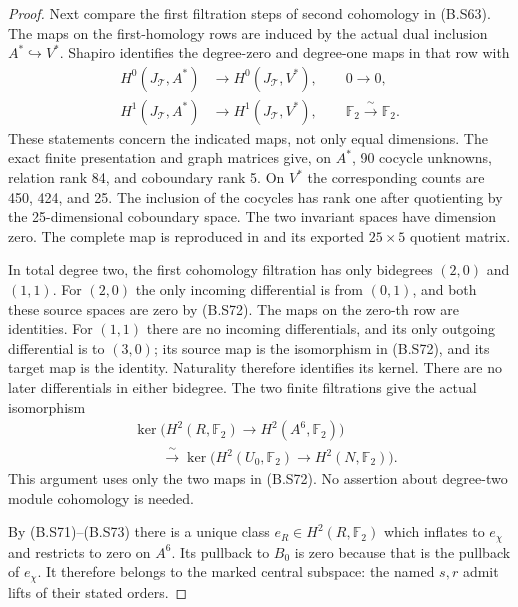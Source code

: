 \begin{proof}
Next compare the first filtration steps of second
cohomology in (B.S63).  The maps on the first-homology
rows are induced by the actual dual inclusion
$A^*\hookrightarrow V^*$.  Shapiro identifies the
degree-zero and degree-one maps in that row with
\[
\begin{aligned}
 H^0(J_{\mathcal T},A^*)&\longrightarrow
                         H^0(J_{\mathcal T},V^*),\qquad 0\longrightarrow0,\\
 H^1(J_{\mathcal T},A^*)&\longrightarrow
                         H^1(J_{\mathcal T},V^*),\qquad
                         \mathbb F_2\xrightarrow{\ \sim\ }\mathbb F_2.
\end{aligned}                                                   \tag{B.S72}
\]
These statements concern the indicated maps, not only
equal dimensions.  The exact finite presentation and
graph matrices give, on $A^*$, 90 cocycle unknowns,
relation rank 84, and coboundary rank 5.  On $V^*$ the
corresponding counts are 450, 424, and 25.  The
inclusion of the cocycles has rank one after quotienting
by the 25-dimensional coboundary space.  The two
invariant spaces have dimension zero.  The complete
map is reproduced in
and its exported $25\times5$ quotient matrix.

In total degree two, the first cohomology filtration
has only bidegrees $(2,0)$ and $(1,1)$.  For $(2,0)$
the only incoming differential is from $(0,1)$, and
both these source spaces are zero by (B.S72).  The
maps on the zero-th row are identities.  For $(1,1)$
there are no incoming differentials, and its only
outgoing differential is to $(3,0)$; its source map is
the isomorphism in (B.S72), and its target map is the
identity.  Naturality therefore identifies its kernel.
There are no later differentials in either bidegree.
The two finite filtrations give the actual isomorphism
\[
\begin{aligned}
 &\ker\bigl(H^2(R,\mathbb F_2)\to H^2(A^6,\mathbb F_2)\bigr)\\
 &\hspace{2em}\xrightarrow{\ \sim\ }
 \ker\bigl(H^2(U_0,\mathbb F_2)\to H^2(N,\mathbb F_2)\bigr).
\end{aligned}
                                                               \tag{B.S73}
\]
This argument uses only the two maps in (B.S72).
No assertion about degree-two module cohomology is
needed.

By (B.S71)--(B.S73) there is a unique class
$e_R\in H^2(R,\mathbb F_2)$ which inflates to
$e_\chi$ and restricts to zero on $A^6$.
Its pullback to $B_0$ is zero because that is the
pullback of $e_\chi$.  It therefore belongs to the
marked central subspace: the named $s,r$ admit lifts
of their stated orders.


\end{proof}
